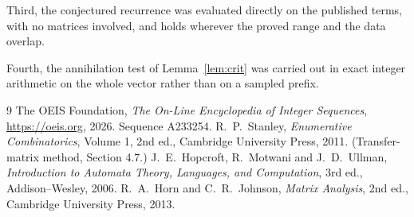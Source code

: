 \documentclass[11pt,a4paper]{article}
\theoremstyle{plain}
\theoremstyle{definition}
\begin{document}
Third, the conjectured recurrence was evaluated directly on the published terms, with no
matrices involved, and holds wherever the proved range and the data overlap.

Fourth, the annihilation test of Lemma~\ref{lem:crit} was carried out in exact integer
arithmetic on the whole vector rather than on a sampled prefix.

\begin{thebibliography}{9}
 The OEIS Foundation, \emph{The On-Line Encyclopedia of Integer
Sequences}, \url{https://oeis.org}, 2026. Sequence A233254.
 R.~P.~Stanley, \emph{Enumerative Combinatorics}, Volume 1, 2nd ed.,
Cambridge University Press, 2011. (Transfer-matrix method, Section 4.7.)
 J.~E.~Hopcroft, R.~Motwani and J.~D.~Ullman, \emph{Introduction to Automata
Theory, Languages, and Computation}, 3rd ed., Addison--Wesley, 2006.
 R.~A.~Horn and C.~R.~Johnson, \emph{Matrix Analysis}, 2nd ed., Cambridge
University Press, 2013.
\end{thebibliography}
\end{document}
